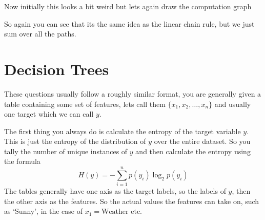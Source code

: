 \documentclass[12pt]{article}
\begin{document}
Now initially this looks a bit weird but lets again draw the computation graph \\
\begin{figure}[!h]
    \centering
\end{figure}

So again you can see that its the same idea as the linear chain rule, but we just sum over all the paths. 

\section{Decision Trees}

These questions usually follow a roughly similar format, you are generally given a table containing some set of features, lets call them $\{x_1, x_2, \ldots, x_n\}$ and usually one target which we can call $y$. 
\smallskip 

The first thing you always do is calculate the entropy of the target variable $y$. This is just the entropy of the distribution of $y$ over the entire dataset. So you tally the number of unique instances of $y$ and then calculate the entropy using the formula
\[
    H(y) = -\sum_{i=1}^{n}p(y_i)\log_2 p(y_i)
\]
The tables generally have one axis as the target labels, so the labels of $y$, then the other axis as the features. So the actual values the features can take on, such as `Sunny', in the case of $x_1 = \text{Weather}$ etc. 
\smallskip
\end{document}
